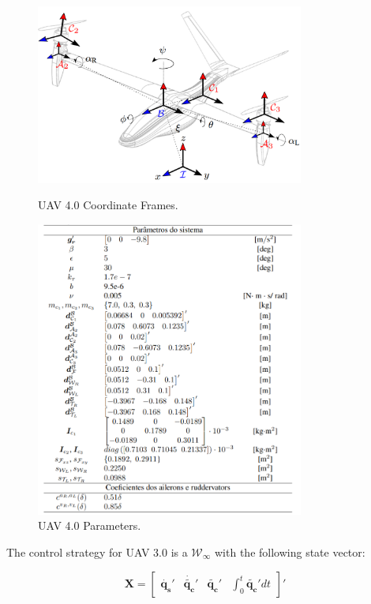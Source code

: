 \begin{figure} [!ht]
	\centering
	\begin{minipage}{.5\textwidth}
		\centering
		\includegraphics[width=250pt]{figuras/v4frames}
		\caption{UAV 4.0 Coordinate Frames.}
		\label{v4frames}
	\end{minipage}%
	\begin{minipage}{.5\textwidth}
		\centering
		\includegraphics[width=250pt]{figuras/v4tab}
		\caption{UAV 4.0 Parameters.}
		\label{v4tab}
	\end{minipage}
\end{figure}

The control strategy for UAV 3.0 is a $\mathcal{W}_\infty$ with the following state vector:

\begin{equation*}
\bm{X} = \begin{bmatrix}
\dot{\bm{q_{s}}}' & \dot{\tilde{\bm{q_{c}}}}' & \tilde{\bm{q_{c}}}' & \int_{0}^{t}{\tilde{\bm{q_{c}}}'}dt
\end{bmatrix}'
\end{equation*}

